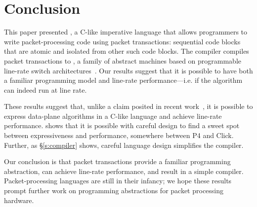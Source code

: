 \section{Conclusion}
\label{s:conclusion}

This paper presented \pktlanguage, a C-like imperative language that allows
programmers to write packet-processing code using packet transactions:
sequential code blocks that are atomic and isolated from other such code
blocks. The \pktlanguage compiler compiles packet transactions to \absmachine,
a family of abstract machines based on programmable line-rate switch
architectures~\cite{flexpipe, xpliant, rmt}. Our results suggest that it is
possible to have both a familiar programming model and line-rate
performance---i.e. if the algorithm can indeed run at line rate.

These results suggest that, unlike a claim posited in recent
work~\cite{p4}, it is possible to express data-plane algorithms in a
C-like language and achieve line-rate performance. \pktlanguage shows
that it is possible with careful design to find a sweet spot between
expressiveness and performance, somewhere between P4 and Click.
Further, as \S\ref{s:compiler} shows, careful language design
simplifies the compiler.  

Our conclusion is that packet transactions provide a familiar
programming abstraction, can achieve line-rate performance, and result
in a simple compiler.  Packet-processing languages are still in their
infancy; we hope these results prompt further work on programming
abstractions for packet processing hardware.
